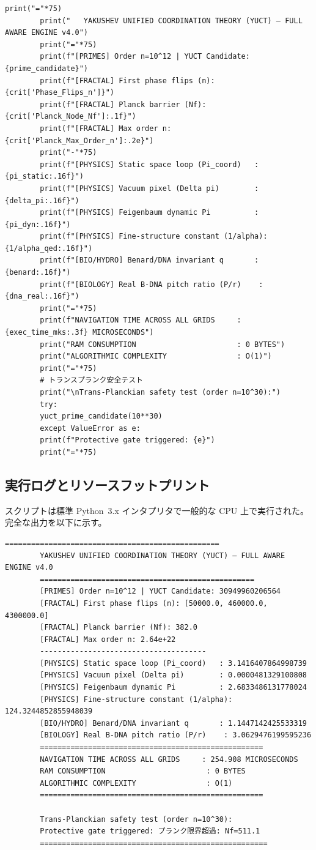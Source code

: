 \documentclass[12pt,a4paper]{article}
\begin{document}
\begin{lstlisting}[caption={完全 YUCT 座標エンジン v4.0 (\texttt{yuct\_constants.py})}, label={lst:yuct-engine}]
		print("="*75)
		print("   YAKUSHEV UNIFIED COORDINATION THEORY (YUCT) — FULL AWARE ENGINE v4.0")
		print("="*75)
		print(f"[PRIMES] Order n=10^12 | YUCT Candidate: {prime_candidate}")
		print(f"[FRACTAL] First phase flips (n): {crit['Phase_Flips_n']}")
		print(f"[FRACTAL] Planck barrier (Nf): {crit['Planck_Node_Nf']:.1f}")
		print(f"[FRACTAL] Max order n: {crit['Planck_Max_Order_n']:.2e}")
		print("-"*75)
		print(f"[PHYSICS] Static space loop (Pi_coord)   : {pi_static:.16f}")
		print(f"[PHYSICS] Vacuum pixel (Delta pi)        : {delta_pi:.16f}")
		print(f"[PHYSICS] Feigenbaum dynamic Pi          : {pi_dyn:.16f}")
		print(f"[PHYSICS] Fine-structure constant (1/alpha): {1/alpha_qed:.16f}")
		print(f"[BIO/HYDRO] Benard/DNA invariant q       : {benard:.16f}")
		print(f"[BIOLOGY] Real B-DNA pitch ratio (P/r)    : {dna_real:.16f}")
		print("="*75)
		print(f"NAVIGATION TIME ACROSS ALL GRIDS     : {exec_time_mks:.3f} MICROSECONDS")
		print("RAM CONSUMPTION                       : 0 BYTES")
		print("ALGORITHMIC COMPLEXITY                : O(1)")
		print("="*75)
		# トランスプランク安全テスト
		print("\nTrans-Planckian safety test (order n=10^30):")
		try:
		yuct_prime_candidate(10**30)
		except ValueError as e:
		print(f"Protective gate triggered: {e}")
		print("="*75)
	\end{lstlisting}
	
	\subsection{実行ログとリソースフットプリント}
	
	スクリプトは標準 Python~3.x インタプリタで一般的な CPU 上で実行された。完全な出力を以下に示す。
	
	\begin{lstlisting}[style=output, caption={エンジン実行出力}]
		=================================================
		YAKUSHEV UNIFIED COORDINATION THEORY (YUCT) — FULL AWARE ENGINE v4.0
		=================================================
		[PRIMES] Order n=10^12 | YUCT Candidate: 30949960206564
		[FRACTAL] First phase flips (n): [50000.0, 460000.0, 4300000.0]
		[FRACTAL] Planck barrier (Nf): 382.0
		[FRACTAL] Max order n: 2.64e+22
		--------------------------------------
		[PHYSICS] Static space loop (Pi_coord)   : 3.1416407864998739
		[PHYSICS] Vacuum pixel (Delta pi)        : 0.0000481329100808
		[PHYSICS] Feigenbaum dynamic Pi          : 2.6833486131778024
		[PHYSICS] Fine-structure constant (1/alpha): 124.3244852855948039
		[BIO/HYDRO] Benard/DNA invariant q       : 1.1447142425533319
		[BIOLOGY] Real B-DNA pitch ratio (P/r)    : 3.0629476199595236
		===================================================
		NAVIGATION TIME ACROSS ALL GRIDS     : 254.908 MICROSECONDS
		RAM CONSUMPTION                       : 0 BYTES
		ALGORITHMIC COMPLEXITY                : O(1)
		===================================================
		
		Trans-Planckian safety test (order n=10^30):
		Protective gate triggered: プランク限界超過: Nf=511.1
		====================================================
	\end{lstlisting}
	
\end{document}

